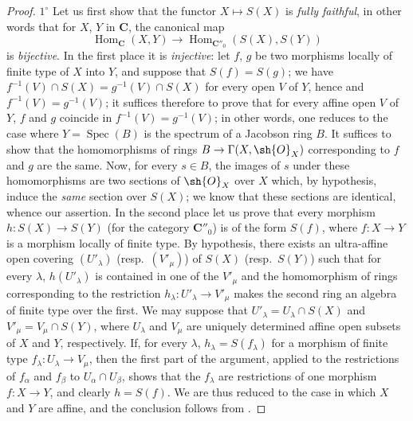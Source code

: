 \begin{proof}
$1^\circ$ Let us first show that the functor $X\mapsto S(X)$ is \emph{fully faithful}, in other words that for $X$, $Y$ in $\mathbf{C}$, the canonical map
\[
  \operatorname{Hom}_{\mathbf{C}}(X,Y)\to\operatorname{Hom}_{\mathbf{C}''_0}(S(X),S(Y))
\]
is \emph{bijective}.
In the first place it is \emph{injective}: let $f$, $g$ be two morphisms locally of finite type of $X$ into $Y$, and suppose that $S(f)=S(g)$; we have $f^{-1}(V)\cap S(X)=g^{-1}(V)\cap S(X)$ for every open $V$ of $Y$, hence  and  $f^{-1}(V)=g^{-1}(V)$; it suffices therefore to prove that for every affine open $V$ of $Y$, $f$ and $g$ coincide in $f^{-1}(V)=g^{-1}(V)$; in other words, one reduces to the case where $Y=\operatorname{Spec}(B)$ is the spectrum of a Jacobson ring $B$.
It suffices  to show that the homomorphisms of rings $B\to\Gamma(X,\sh{O}_X)$ corresponding to $f$ and $g$ are the same.
Now, for every $s\in B$, the images of $s$ under these homomorphisms are two sections of $\sh{O}_X$ over $X$ which, by hypothesis, induce the \emph{same} section over $S(X)$; we know  that these sections are identical, whence our assertion.
In the second place let us prove that every morphism $h:S(X)\to S(Y)$ (for the category $\mathbf{C}''_0$) is of the form $S(f)$, where $f:X\to Y$ is a morphism locally of finite type.
By hypothesis, there exists an ultra-affine open covering $(U'_\lambda)$ (resp.\ $(V'_\mu)$) of $S(X)$ (resp.\ $S(Y)$) such that for every $\lambda$, $h(U'_\lambda)$ is contained in one of the $V'_\mu$ and the homomorphism of rings corresponding to the restriction $h_\lambda:U'_\lambda\to V'_\mu$ makes the second ring an algebra of finite type over the first.
We may suppose that $U'_\lambda=U_\lambda\cap S(X)$ and $V'_\mu=V_\mu\cap S(Y)$, where $U_\lambda$ and $V_\mu$ are uniquely determined affine open subsets of $X$ and $Y$, respectively. If, for every $\lambda$, $h_\lambda=S(f_\lambda)$ for a morphism of finite type $f_\lambda:U_\lambda\to V_\mu$, then the first part of the argument, applied to the restrictions of $f_\alpha$ and $f_\beta$ to $U_\alpha\cap U_\beta$, shows that the $f_\lambda$ are restrictions of one morphism $f:X\to Y$, and clearly $h=S(f)$. We are thus reduced to the case in which $X$ and $Y$ are affine, and the conclusion follows from .


\end{proof}
